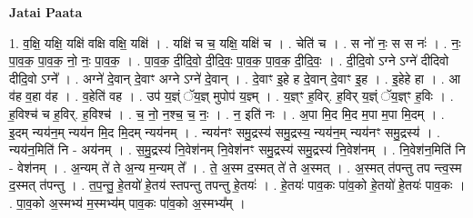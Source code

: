 \documentclass[17pt]{extarticle}
\begin{document}
\textbf{Jatai Paata} \newline

1. व॒क्षि॒ यक्षि॒ यक्षि॑ वक्षि वक्षि॒ यक्षि॑ । . यक्षि॑ च च॒ यक्षि॒ यक्षि॑ च । . चेति॑ च । . स नो॑ नः॒ स स नः॑ । . नः॒ पा॒व॒क॒ पा॒व॒क॒ नो॒ नः॒ पा॒व॒क॒ । . पा॒व॒क॒ दी॒दि॒वो॒ दी॒दि॒वः॒ पा॒व॒क॒ पा॒व॒क॒ दी॒दि॒वः॒ । . दी॒दि॒वो ऽग्ने ऽग्ने॑ दीदिवो दीदि॒वो ऽग्ने᳚ । . अग्ने॑ दे॒वान् दे॒वाꣳ अग्ने ऽग्ने॑ दे॒वान् । . दे॒वाꣳ इ॒हे ह दे॒वान् दे॒वाꣳ इ॒ह । . इ॒हेहे हा । . आ व॑ह व॒हा व॑ह । . व॒हेति॑ वह । . उप॑ य॒ज्ञ्ं ॅय॒ज्ञ् मुपोप॑ य॒ज्ञ्म् । . य॒ज्ञ्ꣳ ह॒विर्. ह॒विर् य॒ज्ञ्ं ॅय॒ज्ञ्ꣳ ह॒विः । . ह॒विश्च॑ च ह॒विर्. ह॒विश्च॑ । . च॒ नो॒ न॒श्च॒ च॒ नः॒ । . न॒ इति॑ नः । . अ॒पा मि॒द मि॒द म॒पा म॒पा मि॒दम् । . इ॒दम् न्यय॑न॒म् न्यय॑न मि॒द मि॒दम् न्यय॑नम् । . न्यय॑नꣳ समु॒द्रस्य॑ समु॒द्रस्य॒ न्यय॑न॒म् न्यय॑नꣳ समु॒द्रस्य॑ । . न्यय॑न॒मिति॑ नि - अय॑नम् । . स॒मु॒द्रस्य॑ नि॒वेश॑नम् नि॒वेश॑नꣳ समु॒द्रस्य॑ समु॒द्रस्य॑ नि॒वेश॑नम् । . नि॒वेश॑न॒मिति॑ नि - वेश॑नम् । . अ॒न्यम् ते॑ ते अ॒न्य म॒न्यम् ते᳚ । . ते॒ अ॒स्म द॒स्मत् ते॑ ते अ॒स्मत् । . अ॒स्मत् त॑पन्तु तप न्त्व॒स्म द॒स्मत् त॑पन्तु । . त॒प॒न्तु॒ हे॒तयो॑ हे॒तय॑ स्तपन्तु तपन्तु हे॒तयः॑ । . हे॒तयः॑ पाव॒कः पा॑व॒को हे॒तयो॑ हे॒तयः॑ पाव॒कः । . पा॒व॒को अ॒स्मभ्य॑ म॒स्मभ्य॑म् पाव॒कः पा॑व॒को अ॒स्मभ्य᳚म् । \newline
\end{document}
